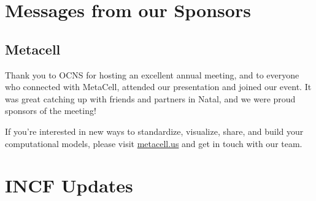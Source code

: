 \documentclass[11pt,a4paper,oneside]{article}
\begin{document}
\section*{Messages from our Sponsors}%
\subsection*{Metacell}%
\begin{displayquote}
  Thank you to OCNS for hosting an excellent annual meeting, and to everyone who connected with MetaCell, attended our presentation and joined our event.
  It was great catching up with friends and partners in Natal, and we were proud sponsors of the meeting!

  If you're interested in new ways to standardize, visualize, share, and build your computational models, please visit \url{metacell.us} and get in touch with our team.
\end{displayquote}

\newpage
\section*{INCF Updates}%
\lipsum[1-3]
\end{document}
